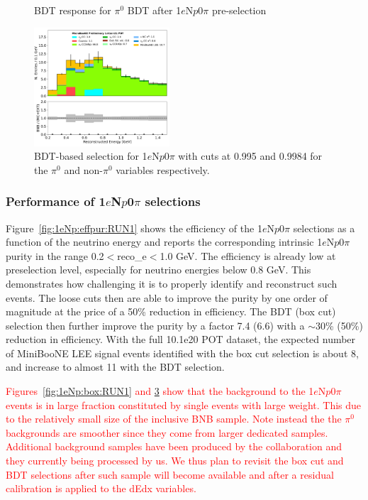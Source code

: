 \documentclass[a4paper]{article}
\newcommand{\npsel}{1$e$N$p$0$\pi$ }
\begin{document}
\begin{figure}[H]
\begin{center}
\begin{subfigure}[b]{0.45\textwidth}
    \caption{\label{fig:1eNp:bdt:pi0:zoom}}
    \end{subfigure}
\caption{\label{fig:1eNp:bdt:pi0}BDT response for $\pi^0$ BDT after \npsel pre-selection}
\end{center}
\end{figure}

\begin{figure}[H]
\begin{center}
\includegraphics[width=0.45\textwidth]{1eNp/reco_e_01162020_bdt_RUN1.pdf}
\caption{\label{fig:1eNp:bdt:RUN1}BDT-based selection for \npsel with cuts at 0.995 and 0.9984 for the $\pi^0$ and non-$\pi^0$ variables respectively.}
\end{center}
\end{figure}

\subsubsection{Performance of \npsel selections}

Figure~\ref{fig:1eNp:effpur:RUN1} shows the efficiency of the \npsel selections as a function of the neutrino energy and reports the corresponding intrinsic \npsel purity in the range 0.2$<$reco\_e$<$1.0 \si{\GeV}. The efficiency is already low at preselection level, especially for neutrino energies below 0.8 \si{\GeV}. This demonstrates how challenging it is to properly identify and reconstruct such events. The loose cuts then are able to improve the purity by one order of magnitude at the price of a 50\% reduction in efficiency. The BDT (box cut) selection then further improve the purity by a factor 7.4 (6.6) with a $\sim$30\% (50\%) reduction in efficiency. With the full 10.1e20 POT dataset, the expected number of MiniBooNE LEE signal events identified with the box cut selection is about 8, and increase to almost 11 with the BDT selection.

\textcolor{red}{Figures~\ref{fig:1eNp:box:RUN1} and \ref{fig:1eNp:bdt:RUN1} show that the background to the \npsel events is in large fraction constituted by single events with large weight. This due to the relatively small size of the inclusive BNB sample. Note instead the the $\pi^0$ backgrounds are smoother since they come from larger dedicated samples. Additional background samples have been produced by the collaboration and they currently being processed by us. We thus plan to revisit the box cut and BDT selections after such sample will become available and after a residual calibration is applied to the dEdx variables.}
\end{document}
